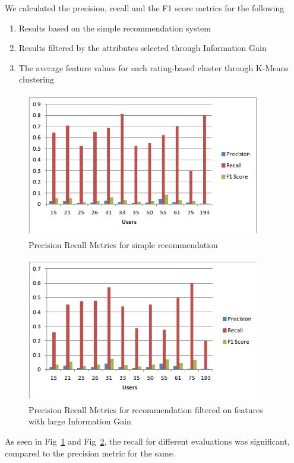 \documentclass{article}
\begin{document}
 We calculated the precision, recall and the F1 score metrics for the following 
\begin{enumerate} 
\item Results based on the simple recommendation system
\item Results filtered by the attributes selected through Information Gain
\item The average feature values for each rating-based cluster through K-Means clustering
\end{enumerate}

\begin{figure}[H]
\centering
\includegraphics[height=2.5in, width=4in]{PrecRecallBasic.png}
\caption{Precision Recall Metrics for simple recommendation}
\label{precrecallbasic}
\end{figure}

\begin{figure}[H]
\centering
\includegraphics[height=2.5in, width=4in]{PrecRecallIG.png}
\caption{Precision Recall Metrics for recommendation filtered on features with large Information Gain}
\label{precrecallig}
\end{figure}

As seen in Fig~\ref{precrecallbasic} and Fig~\ref{precrecallig}, the recall for different evaluations was significant, compared to the precision metric for the same.
\end{document}
